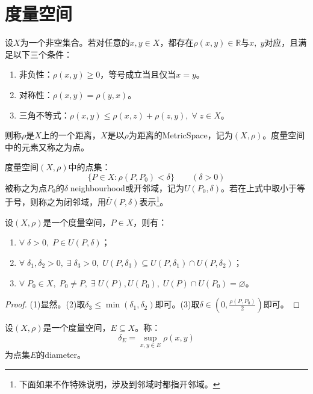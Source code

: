 \chapter{度量空间}

\begin{definition}
	设$X$为一个非空集合。若对任意的$x,y\in X$，都存在$\rho(x,y)\in\mathbb{R}$与$x,\;y$对应，且满足以下三个条件：
	\begin{enumerate}
		\item 非负性：$\rho(x,y)\geqslant0$，等号成立当且仅当$x=y$。
		\item 对称性：$\rho(x,y)=\rho(y,x)$。
		\item 三角不等式：$\rho(x,y)\leqslant\rho(x,z)+\rho(z,y),\;\forall\;z\in X$。
	\end{enumerate}
	则称$\rho$是$X$上的一个距离，$X$是以$\rho$为距离的\gls{MetricSpace}，记为$(X,\rho)$。度量空间中的元素又称之为点。
\end{definition}
\begin{definition}
	度量空间$(X,\rho)$中的点集：
	\begin{equation*}
		\{P\in X:\rho(P,P_0)<\delta\}\qquad (\delta>0)
	\end{equation*}
	被称之为点$P_0$的$\delta\;$\gls{neighbourhood}或开邻域，记为$U(P_0,\delta)$。若在上式中取小于等于号，则称之为闭邻域，用$\bar{U}(P,\delta)$表示\footnote{下面如果不作特殊说明，涉及到邻域时都指开邻域。}。
\end{definition}
\begin{property}\label{prop:Neighbourhood}
	设$(X,\rho)$是一个度量空间，$P\in X$，则有：
	\begin{enumerate}
		\item $\forall\;\delta>0,\;P\in U(P,\delta)$；
		\item $\forall\;\delta_1,\delta_2>0,\;\exists\;\delta_3>0,\;U(P,\delta_3)\subseteq U(P,\delta_1)\cap U(P,\delta_2)$；
		\item $\forall\;P_0\in X,\;P_0\ne P,\;\exists\;U(P),U(P_0),\;U(P)\cap U(P_0)=\varnothing$。
	\end{enumerate}
\end{property}
\begin{proof}
	(1)显然。(2)取$\delta_3\leqslant\min(\delta_1,\delta_2)$即可。(3)取$\delta\in\left(0,\frac{\rho(P,P_0)}{2}\right)$即可。
\end{proof}
\begin{definition}
	设$(X,\rho)$是一个度量空间，$E\subseteq X$。称：
	\begin{equation*}
		\delta_E=\sup_{x,y\in E}\rho(x,y)
	\end{equation*}
	为点集$E$的\gls{diameter}。
\end{definition}

